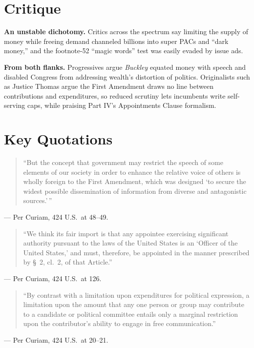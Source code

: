 \documentclass[12pt]{article}
\begin{document}
\section{Critique}

\textbf{An unstable dichotomy.} Critics across the spectrum say limiting the supply of money while freeing demand channeled billions into super PACs and ``dark money,'' and the footnote-52 ``magic words'' test was easily evaded by issue ads.

\textbf{From both flanks.} Progressives argue \textit{Buckley} equated money with speech and disabled Congress from addressing wealth's distortion of politics. Originalists such as Justice Thomas argue the First Amendment draws no line between contributions and expenditures, so reduced scrutiny lets incumbents write self-serving caps, while praising Part IV's Appointments Clause formalism.

\section{Key Quotations}

\begin{quote}
``But the concept that government may restrict the speech of some elements of our society in order to enhance the relative voice of others is wholly foreign to the First Amendment, which was designed `to secure the widest possible dissemination of information from diverse and antagonistic sources.'\,''
\end{quote}
\noindent --- Per Curiam, 424 U.S.\ at 48--49.

\begin{quote}
``We think its fair import is that any appointee exercising significant authority pursuant to the laws of the United States is an `Officer of the United States,' and must, therefore, be appointed in the manner prescribed by \S~2, cl.~2, of that Article.''
\end{quote}
\noindent --- Per Curiam, 424 U.S.\ at 126.

\begin{quote}
``By contrast with a limitation upon expenditures for political expression, a limitation upon the amount that any one person or group may contribute to a candidate or political committee entails only a marginal restriction upon the contributor's ability to engage in free communication.''
\end{quote}
\noindent --- Per Curiam, 424 U.S.\ at 20--21.
\end{document}

